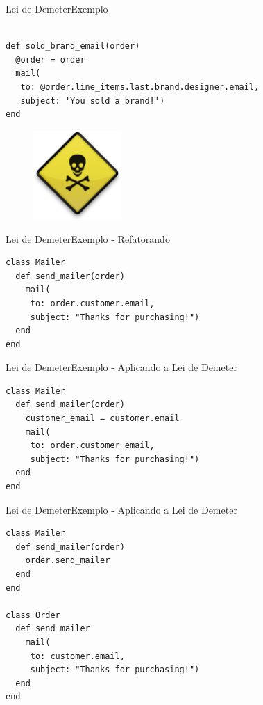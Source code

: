 \documentclass[10pt]{beamer}
\begin{document}
\begin{frame}[fragile]{Lei de Demeter}{Exemplo}

\begin{lstlisting}

def sold_brand_email(order)
  @order = order
  mail(
   to: @order.line_items.last.brand.designer.email,
   subject: 'You sold a brand!')
end

\end{lstlisting}

  \pause

  \begin{figure}
    \includegraphics[width=0.3\textwidth]{images/toxicSign.png}
  \end{figure}

\end{frame}


\begin{frame}[fragile]{Lei de Demeter}{Exemplo - Refatorando}

\begin{lstlisting}
class Mailer
  def send_mailer(order)
    mail(
     to: order.customer.email,
     subject: "Thanks for purchasing!")
  end
end
\end{lstlisting}

\end{frame}

\begin{frame}[fragile]{Lei de Demeter}{Exemplo - Aplicando a Lei de Demeter}

\begin{lstlisting}
class Mailer
  def send_mailer(order)
    customer_email = customer.email
    mail(
     to: order.customer_email,
     subject: "Thanks for purchasing!")
  end
end
\end{lstlisting}

\end{frame}

\begin{frame}[fragile]{Lei de Demeter}{Exemplo - Aplicando a Lei de Demeter}

\begin{lstlisting}
class Mailer
  def send_mailer(order)
    order.send_mailer
  end
end

class Order
  def send_mailer
    mail(
     to: customer.email,
     subject: "Thanks for purchasing!")
  end
end
\end{lstlisting}

\end{frame}
\end{document}
